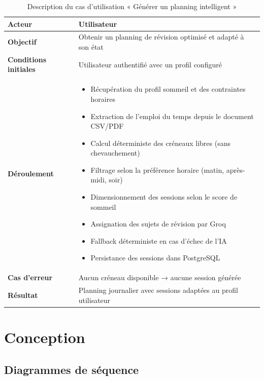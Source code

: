 \begin{table}[H]
\centering
\renewcommand{\arraystretch}{1.2}
\begin{tabular}{|p{4cm}|p{10cm}|}
\hline
\textbf{Acteur} & Utilisateur \\ \hline

\textbf{Objectif} & Obtenir un planning de révision optimisé et adapté à son état \\ \hline

\textbf{Conditions initiales} & Utilisateur authentifié avec un profil configuré \\ \hline

\textbf{Déroulement} &
\begin{itemize}
    \item Récupération du profil sommeil et des contraintes horaires
    \item Extraction de l'emploi du temps depuis le document CSV/PDF
    \item Calcul déterministe des créneaux libres (sans chevauchement)
    \item Filtrage selon la préférence horaire (matin, après-midi, soir)
    \item Dimensionnement des sessions selon le score de sommeil
    \item Assignation des sujets de révision par Groq
    \item Fallback déterministe en cas d'échec de l'IA
    \item Persistance des sessions dans PostgreSQL
\end{itemize} \\ \hline

\textbf{Cas d'erreur} & Aucun créneau disponible → aucune session générée \\ \hline

\textbf{Résultat} & Planning journalier avec sessions adaptées au profil utilisateur \\ \hline
\end{tabular}
\caption{Description du cas d'utilisation « Générer un planning intelligent »}
\label{tab:uc_planning}
\end{table}

\section{Conception}
\subsection{Diagrammes de séquence}

